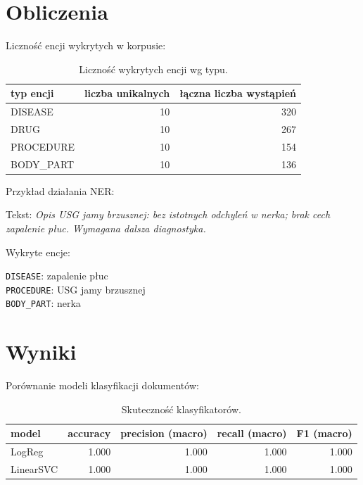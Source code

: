 \documentclass[12pt,a4paper]{article}
\begin{document}
\section{Obliczenia}
Liczność encji wykrytych w korpusie:

\begin{table}[H]
\centering
\begin{tabular}{lrr}
\toprule
typ encji & liczba unikalnych & łączna liczba wystąpień \\
\midrule
DISEASE & 10 & 320 \\
DRUG & 10 & 267 \\
PROCEDURE & 10 & 154 \\
BODY\_PART & 10 & 136 \\
\bottomrule
\end{tabular}

\caption{Liczność wykrytych encji wg typu.}
\label{tab:ent}
\end{table}

Przykład działania NER:

Tekst: \textit{Opis USG jamy brzusznej: bez istotnych odchyleń w nerka; brak cech zapalenie płuc. Wymagana dalsza diagnostyka.}

Wykryte encje:

\quad \texttt{DISEASE}: zapalenie płuc\\

\quad \texttt{PROCEDURE}: USG jamy brzusznej\\

\quad \texttt{BODY\_PART}: nerka\\

\section{Wyniki}
Porównanie modeli klasyfikacji dokumentów:

\begin{table}[H]
\centering
\begin{tabular}{lrrrr}
\toprule
model & accuracy & precision (macro) & recall (macro) & F1 (macro) \\
\midrule
LogReg & 1.000 & 1.000 & 1.000 & 1.000 \\
LinearSVC & 1.000 & 1.000 & 1.000 & 1.000 \\
\bottomrule
\end{tabular}

\caption{Skuteczność klasyfikatorów.}
\label{tab:cls}
\end{table}
\end{document}
